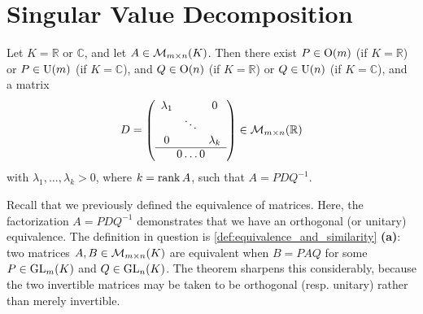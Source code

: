 \renewcommand{\thetheorem}{26.a.\arabic{theorem}}
\setcounter{theorem}{0}
\setcounter{chapter}{25}

\chapter{Singular Value Decomposition}

\begin{theorem}
\label{thm:singular_value_decomposition}
Let $K = \mathbb{R}$ or $\mathbb{C}$, and let $A \in \mathcal{M}_{m \times n}(K)$. Then there exist $P \in \operatorname{O}(m)$ (if $K = \mathbb{R}$) or $P \in \operatorname{U}(m)$ (if $K = \mathbb{C}$), and $Q \in \operatorname{O}(n)$ (if $K = \mathbb{R}$) or $Q \in \operatorname{U}(n)$ (if $K = \mathbb{C}$), and a  matrix
\[
D = \left(
\begin{array}{ccc}
\lambda_1 & & 0 \\
& \ddots & \\
0 & & \lambda_k \\
\hline
\multicolumn{3}{c}{0 \dots 0}
\end{array}
\right) \in \M_{m \times n}(\mathbb{R})
\]
with $\lambda_1, \dots, \lambda_k > 0$, where $k = \operatorname{rank} A$, such that $A = P D Q^{-1}$.
\end{theorem}

\begin{remark}
Recall that we previously defined the equivalence of matrices. Here, the factorization $A = P D Q^{-1}$ demonstrates that we have an orthogonal (or unitary) equivalence.
The definition in question is \cref{def:equivalence_and_similarity} \textbf{(a)}: two matrices $A, B \in \mathcal{M}_{m \times n}(K)$ are equivalent when $B = PAQ$ for some $P \in \operatorname{GL}_m(K)$ and $Q \in \operatorname{GL}_n(K)$. The theorem sharpens this considerably, because the two invertible matrices may be taken to be orthogonal (resp. unitary) rather than merely invertible.
\end{remark}

